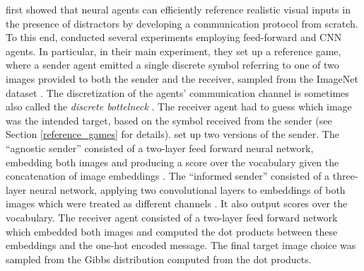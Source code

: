 \cite{lazaridou2016multi} first showed that neural agents can efficiently reference realistic visual inputs in the presence of distractors by developing a communication protocol from scratch. To this end, \textcite{lazaridou2016multi} conducted several experiments employing feed-forward and CNN agents. In particular, in their main experiment, they set up a reference game, where a sender agent emitted a single discrete symbol referring to one of two images provided to both the sender and the receiver, sampled from the ImageNet dataset \parencite{deng2009imagenet}. The discretization of the agents' communication channel is sometimes also called the \textit{discrete bottelneck} \parencite{lazaridou2020multi}. 
The receiver agent had to guess  which image was the intended target, based on the symbol received from the sender (see Section \ref{reference_games} for details). %
\cite{lazaridou2016multi} set up two versions of the sender. The ``agnostic sender'' consisted of a two-layer feed forward neural network, embedding both images and producing a score over the vocabulary given the concatenation of image embeddings \parencite[][p. 3]{lazaridou2016multi}. The ``informed sender'' consisted of a three-layer neural network, applying two convolutional layers to embeddings of both images which were treated as different channels \parencite[][p. 3]{lazaridou2016multi}. It also output scores over the vocabulary. %
The receiver agent consisted of a two-layer feed forward network which embedded both images and computed the dot products between these embeddings and the one-hot encoded message. The final target image choice was sampled from the Gibbs distribution computed from the dot products. %
